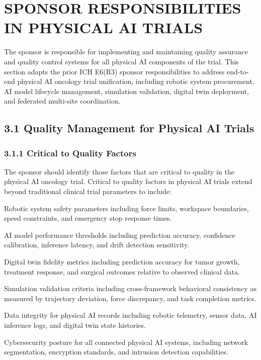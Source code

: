 \section{SPONSOR RESPONSIBILITIES IN PHYSICAL AI TRIALS}

The sponsor is responsible for implementing and maintaining quality assurance and quality control systems for all physical AI components of the trial. This section adapts the prior ICH E6(R3) sponsor responsibilities to address end-to-end physical AI oncology trial unification, including robotic system procurement, AI model lifecycle management, simulation validation, digital twin deployment, and federated multi-site coordination.

\subsection{3.1 Quality Management for Physical AI Trials}

\subsubsection{3.1.1 Critical to Quality Factors}

The sponsor should identify those factors that are critical to quality in the physical AI oncology trial. Critical to quality factors in physical AI trials extend beyond traditional clinical trial parameters to include:

\begin{description}[leftmargin=2.5cm,style=sameline]

\item[(a)] Robotic system safety parameters including force limits, workspace boundaries, speed constraints, and emergency stop response times.

\item[(b)] AI model performance thresholds including prediction accuracy, confidence calibration, inference latency, and drift detection sensitivity.

\item[(c)] Digital twin fidelity metrics including prediction accuracy for tumor growth, treatment response, and surgical outcomes relative to observed clinical data.

\item[(d)] Simulation validation criteria including cross-framework behavioral consistency as measured by trajectory deviation, force discrepancy, and task completion metrics.

\item[(e)] Data integrity for physical AI records including robotic telemetry, sensor data, AI inference logs, and digital twin state histories.

\item[(f)] Cybersecurity posture for all connected physical AI systems, including network segmentation, encryption standards, and intrusion detection capabilities.

\end{description}

